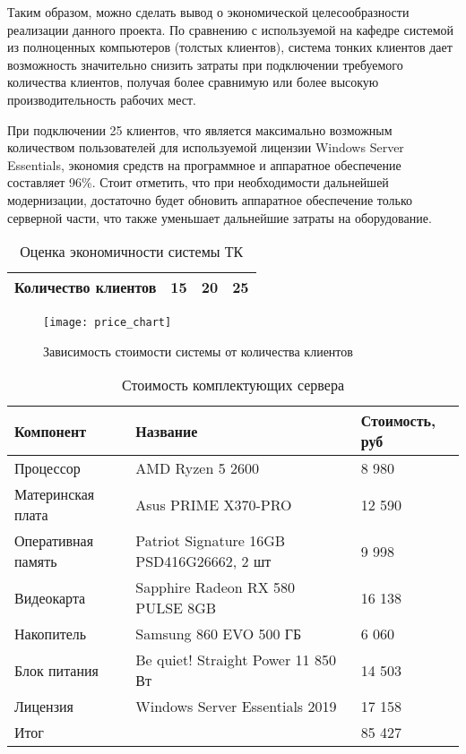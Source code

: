 Таким образом, можно сделать вывод о экономической целесообразности реализации данного
проекта. По сравнению с используемой на кафедре системой из полноценных компьютеров
(толстых клиентов), система тонких клиентов дает возможность значительно снизить затраты
при подключении требуемого количества клиентов, получая более сравнимую или более
высокую производительность рабочих мест. 

При подключении 25 клиентов, что является максимально возможным
количеством пользователей для используемой лицензии Windows Server Essentials, экономия
средств на программное и аппаратное обеспечение составляет 96\%.
Стоит отметить, что при необходимости дальнейшей модернизации, достаточно будет обновить
аппаратное обеспечение только серверной части, что также уменьшает дальнейшие затраты на
оборудование.

\begin{table}[h]
    \centering
    \caption{Оценка экономичности системы ТК}
    \label{tab:price_comp}
    \begin{tabu}to \linewidth{X[3,l]X[c,m]X[c,m]X[c,m]}
        \toprule
        Количество клиентов & 15 & 20 & 25 \\
        \midrule
        
        \bottomrule
    \end{tabu}
\end{table}

\begin{figure}[h]
    \center
    \texttt{[image: price\_chart]}
    \caption{Зависимость стоимости системы от количества клиентов}
    \label{pic:price_chart}
\end{figure}

\begin{table}[b]
    \centering
    \caption{Стоимость комплектующих сервера}
    \label{tab:server_price}
    \begin{tabu}to \linewidth{X[m]X[2.2,c,m]X[r,m]}
        \toprule
        Компонент & Название & Стоимость, руб \\
        \midrule
        Процессор          & AMD Ryzen 5 2600                          & 8 980  \\
        Материнская плата  & Asus PRIME X370-PRO                       & 12 590 \\
        Оперативная память & Patriot Signature 16GB PSD416G26662, 2 шт & 9 998   \\
        Видеокарта         & Sapphire Radeon RX 580 PULSE 8GB          & 16 138  \\
        Накопитель         & Samsung 860 EVO 500 ГБ                    & 6 060  \\
        Блок питания       & Be quiet! Straight Power 11 850 Вт        & 14 503 \\
        Лицензия           & Windows Server Essentials 2019            & 17 158 \\
        \midrule
        Итог & & 85 427 \\
        \bottomrule
    \end{tabu}
\end{table}

